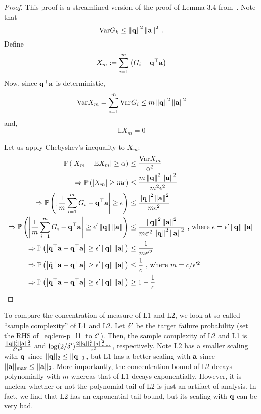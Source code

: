 \begin{proof}
This proof is a streamlined version of the proof of Lemma 3.4 from~\cite{jain10hashing}. 
Note that
\[
  {\text{\normalfont Var}} G_k \leq \left\Vert \mathbf{q} \right\Vert^2 \left\Vert \mathbf{a} \right\Vert^2 \;.
\] 
Define
\[
  X_m := \sum_{i=1}^m \left( G_i - \mathbf{q}^\top \mathbf{a} \right) 
\]
Now, since $\mathbf{q}^\top \mathbf{a}$ is deterministic,
\[
  {\text{\normalfont Var}} X_m = \sum_{i=1}^m {\text{\normalfont Var}} G_i \leq m \left\Vert \mathbf{q} \right\Vert^2 \left\Vert \mathbf{a} \right\Vert^2 
\]
and,
$$ \mathbb{E} X_m = 0 $$

Let us apply Chebyshev's inequality to $X_m$:
\begin{align*}
\mathbb{P} \left( \left\vert X_m - \mathbb{E}X_m \right\vert \geq \alpha \right) &\leq \frac{{\text{\normalfont Var}} X_m}{\alpha^2} \\
\Rightarrow \mathbb{P} \left( \left\vert X_m \right\vert \geq m \epsilon \right) &\leq \frac{ m \left\Vert \mathbf{q} \right\Vert^2 \left\Vert \mathbf{a} \right\Vert^2 }{m^2 \epsilon^2} \\
\Rightarrow \mathbb{P} \left( \left\vert \frac{1}{m} \sum_{i=1}^m G_i - \mathbf{q}^\top \mathbf{a} \right\vert \geq \epsilon \right) &\leq \frac{ \left\Vert \mathbf{q} \right\Vert^2 \left\Vert \mathbf{a} \right\Vert^2 }{m \epsilon^2} \\
\Rightarrow \mathbb{P} \left( \left\vert \frac{1}{m} \sum_{i=1}^m G_i - \mathbf{q}^\top \mathbf{a} \right\vert \geq \epsilon' \left\Vert \mathbf{q} \right\Vert \left\Vert \mathbf{a} \right\Vert  \right) &\leq \frac{ \left\Vert \mathbf{q} \right\Vert^2 \left\Vert \mathbf{a} \right\Vert^2 }{m \epsilon'^2 \left\Vert \mathbf{q} \right\Vert^2 \left\Vert \mathbf{a} \right\Vert^2 } \mbox{ , where $ \epsilon = \epsilon' \left\Vert \mathbf{q} \right\Vert \left\Vert \mathbf{a} \right\Vert $} \\
\Rightarrow \mathbb{P} \left( \left\vert \tilde{\mathbf{q}}^\top \mathbf{a}  - \mathbf{q}^\top \mathbf{a} \right\vert \geq \epsilon' \left\Vert \mathbf{q} \right\Vert \left\Vert \mathbf{a} \right\Vert  \right) &\leq \frac{ 1 }{m \epsilon'^2 } \\
\Rightarrow \mathbb{P} \left( \left\vert \tilde{\mathbf{q}}^\top \mathbf{a}  - \mathbf{q}^\top \mathbf{a} \right\vert \geq \epsilon' \left\Vert \mathbf{q} \right\Vert \left\Vert \mathbf{a} \right\Vert  \right) &\leq \frac{ 1 }{c} \mbox{ , where $ m = c/\epsilon'^2$} \\
\Rightarrow \mathbb{P} \left( \left\vert \tilde{\mathbf{q}}^\top \mathbf{a}  - \mathbf{q}^\top \mathbf{a} \right\vert \geq \epsilon' \left\Vert \mathbf{q} \right\Vert \left\Vert \mathbf{a} \right\Vert  \right) &\geq 1 - \frac{ 1 }{c}
\end{align*}
\end{proof}

To compare the concentration of measure of L1 and L2, we look at so-called ``sample complexity'' of L1 and L2.
Let ${\delta}'$ be the target failure probability (set the RHS of~\eqref{eq:lem-p_l1} to ${\delta}'$).
Then, the sample complexity of L2 and L1 is ${ \frac{||{{\mathbf q}}||^2_2||\mathbf{a}||^2_2}{{\delta}' \epsilon^2} }$ and $\log(2/{\delta}'){ \frac{2||{{\mathbf q}}||^2_1||a||^2_{\max}}{\epsilon^2} }$, respectively.
Note L2 has a smaller scaling with ${{\mathbf q}}$ since $||{{\mathbf q}}||_2 \le ||{{\mathbf q}}||_1$, but L1 has a better scaling with $\mathbf{a}$ since $||\mathbf{a}||_{\max} \le ||\mathbf{a}||_2$.
More importantly, the concentration bound of L2 decays polynomially with $m$ whereas that of L1 decays exponentially.
However, it is unclear whether or not the polynomial tail of L2 is just an artifact of analysis.
In fact, we find that L2 has an exponential tail bound, but its scaling with ${{\mathbf q}}$ can be very bad.


